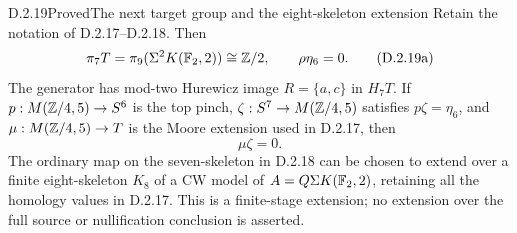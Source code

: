 \begin{claim}{D.2.19}{Proved}{The next target group and the eight-skeleton extension}
Retain the notation of D.2.17--D.2.18. Then
\[
 \pi_7T=\pi_9(\Sigma^2K(\mathbb F_2,2))\cong\mathbb Z/2,
 \qquad \rho\eta_6=0.
 \tag{D.2.19a}
\]
The generator has mod-two Hurewicz image $R=\{a,c\}$ in
$H_7T$. If $p:M(\mathbb Z/4,5)\to S^6$ is the top pinch,
$\zeta:S^7\to M(\mathbb Z/4,5)$ satisfies $p\zeta=\eta_6$,
and $\mu:M(\mathbb Z/4,5)\to T$ is the Moore extension used in
D.2.17, then
\[
 \mu\zeta=0.
 \tag{D.2.19b}
\]
The ordinary map on the seven-skeleton in D.2.18 can be chosen
to extend over a finite eight-skeleton $K_8$ of a CW model of
$A=Q\Sigma K(\mathbb F_2,2)$, retaining all the homology values
in D.2.17. This is a finite-stage extension; no extension
over the full source or nullification conclusion is asserted.
\end{claim}
